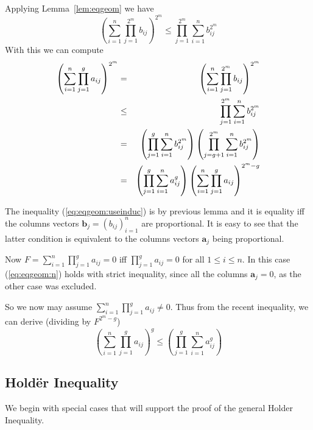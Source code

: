 \begin{thmproof}
Applying Lemma~\ref{lem:eqgeom} we have
\begin{equation*}
 \left(\sum_{i=1}^n \prod_{j=1}^{2^m} b_{ij}\right)^{2^m}
 \leq
 \prod_{j=1}^{2^m} \sum_{i=1}^n b_{ij}^{2^m}
\end{equation*}
With this we can compute
\begin{eqnarray}
\left(\sum_{i=1}^n \prod_{j=1}^g a_{ij}\right)^{2^m}
&=&  \left(\sum_{i=1}^n \prod_{j=1}^{2^m} b_{ij}\right)^{2^m} \notag \\
&\leq& \label{eq:eqgeom:useinduc}
    \prod_{j=1}^{2^m} \sum_{i=1}^n b_{ij}^{2^m} \\
&=& \notag
        \left(\prod_{j=1}^{g} \sum_{i=1}^n b_{ij}^{2^m}\right)
        \left(\prod_{j=g+1}^{2^m} \sum_{i=1}^n b_{ij}^{2^m}\right) \\
&=&     \notag
        \left(\prod_{j=1}^{g} \sum_{i=1}^n a_{ij}^g\right)
        \left(\sum_{i=1}^n \prod_{j=1}^g a_{ij} \right)^{2^m - g}
\end{eqnarray}

The inequality (\ref{eq:eqgeom:useinduc})
is by previous lemma and it is equality iff the columns vectors
\(\mathbf{b}_j = (b_{ij})_{i=1}^n\) are proportional.
It is easy to see that the latter condition is equivalent
to the columns vectors \(\mathbf{a}_j\) being proportional.

Now \(F=\sum_{i=1}^n \prod_{j=1}^g a_{ij} = 0\) iff
\(\prod_{j=1}^g a_{ij} = 0\) for all \(1\leq i \leq n\).
In this case (\ref{eq:eqgeom:n}) holds with strict inequality,
since all the columns \(\mathbf{a}_j=0\), as the other case was excluded.

So we now may assume \(\sum_{i=1}^n \prod_{j=1}^g a_{ij} \neq 0\).
Thus from the recent inequality, we can derive (dividing by \(F^{2^m-g}\))
\begin{equation*}
\left(\sum_{i=1}^n \prod_{j=1}^g a_{ij}\right)^g
\leq \left(\prod_{j=1}^{g} \sum_{i=1}^n a_{ij}^g\right)
\end{equation*}
\end{thmproof}

\subsection{Hold\"er Inequality}

We begin with special cases that will support
the proof of the general Holder Inequality.

